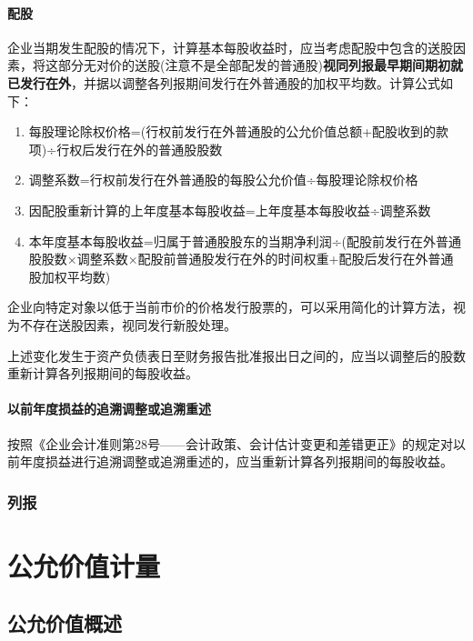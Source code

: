 \documentclass[UTF8,12pt]{ctexart}
\numberwithin{equation}{section} %
\numberwithin{figure}{section}
\numberwithin{table}{section}
\begin{document}
	\paragraph{配股}
	企业当期发生配股的情况下，计算基本每股收益时，应当考虑配股中包含的送股因素，将这部分无对价的送股(注意不是全部配发的普通股)\textbf{视同列报最早期间期初就已发行在外}，并据以调整各列报期间发行在外普通股的加权平均数。计算公式如下：
	\begin{enumerate}
		\item 每股理论除权价格=(行权前发行在外普通股的公允价值总额+配股收到的款项)÷行权后发行在外的普通股股数
		
		\item 调整系数=行权前发行在外普通股的每股公允价值÷每股理论除权价格
		
		\item 因配股重新计算的上年度基本每股收益=上年度基本每股收益÷调整系数
		
		\item 本年度基本每股收益=归属于普通股股东的当期净利润÷(配股前发行在外普通股股数×调整系数×配股前普通股发行在外的时间权重+配股后发行在外普通股加权平均数)
	\end{enumerate}
	
	企业向特定对象以低于当前市价的价格发行股票的，可以采用简化的计算方法，视为不存在送股因素，视同发行新股处理。
	
	上述变化发生于资产负债表日至财务报告批准报出日之间的，应当以调整后的股数重新计算各列报期间的每股收益。
	
	\paragraph{以前年度损益的追溯调整或追溯重述}
	按照《企业会计准则第28号——会计政策、会计估计变更和差错更正》的规定对以前年度损益进行追溯调整或追溯重述的，应当重新计算各列报期间的每股收益。
	
	\subsubsection{列报}

	
	\newpage
	
	\section{公允价值计量}
	\subsection{公允价值概述}
	
\end{document}
